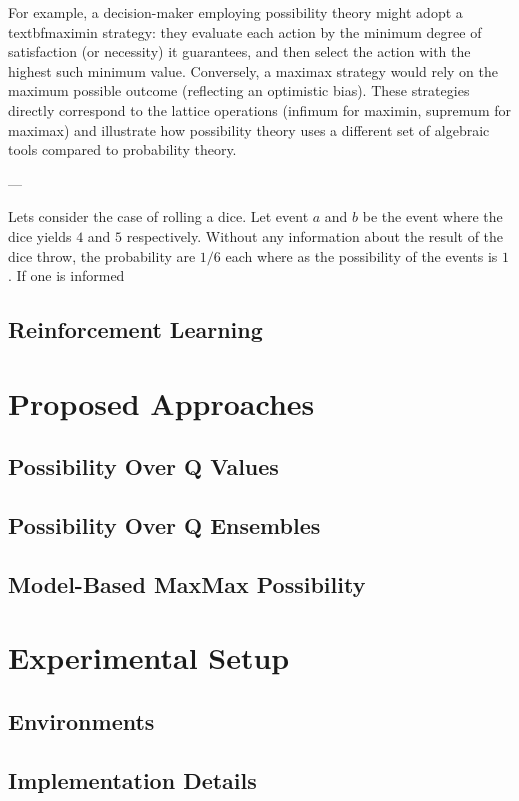 \documentclass[14pt,a4paper]{report}
\begin{document}
For example, a decision-maker employing possibility theory might adopt a \\textbf{maximin strategy}: they evaluate each action by the minimum degree of satisfaction (or necessity) it guarantees, and then select the action with the highest such minimum value. Conversely, a maximax strategy would rely on the maximum possible outcome (reflecting an optimistic bias). These strategies directly correspond to the lattice operations (infimum for maximin, supremum for maximax) and illustrate how possibility theory uses a different set of algebraic tools compared to probability theory.

---






Lets consider the case of rolling a dice. Let event $a$ and $b$ be the event where the dice yields $4$ and $5$ respectively. Without any information about the result of the dice throw, the probability are $1/6$ each where as the possibility of the events is $1$. If one is informed 
\section{Reinforcement Learning}

\chapter{Proposed Approaches}
\section{Possibility Over Q Values}
\section{Possibility Over Q Ensembles}
\section{Model-Based MaxMax Possibility}

\chapter{Experimental Setup}
\section{Environments}
\section{Implementation Details}
\end{document}
